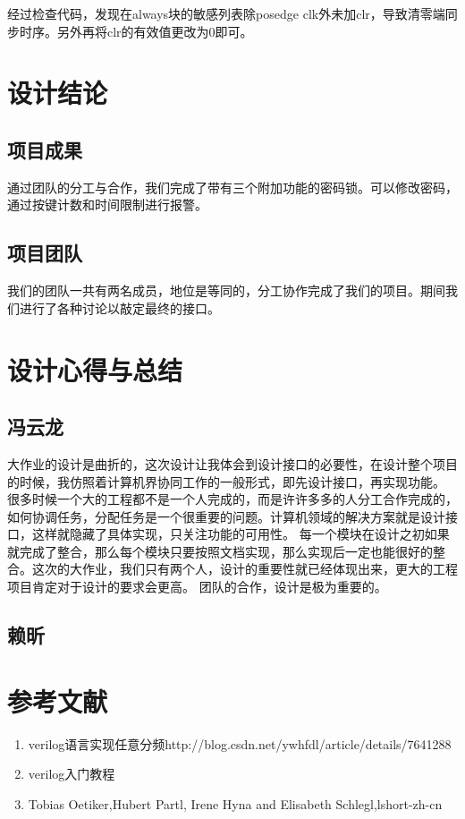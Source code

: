 \documentclass[a4paper,11pt]{ctexart}
\begin{document}
经过检查代码，发现在always块的敏感列表除posedge clk外未加clr，导致清零端同步时序。另外再将clr的有效值更改为0即可。
\section{设计结论}
\subsection{项目成果}
通过团队的分工与合作，我们完成了带有三个附加功能的密码锁。可以修改密码，通过按键计数和时间限制进行报警。
\subsection{项目团队}
我们的团队一共有两名成员，地位是等同的，分工协作完成了我们的项目。期间我们进行了各种讨论以敲定最终的接口。

\section{设计心得与总结}
\subsection{冯云龙}大作业的设计是曲折的，这次设计让我体会到设计接口的必要性，在设计整个项目的时候，我仿照着计算机界协同工作的一般形式，即先设计接口，再实现功能。
很多时候一个大的工程都不是一个人完成的，而是许许多多的人分工合作完成的，如何协调任务，分配任务是一个很重要的问题。计算机领域的解决方案就是设计接口，这样就隐藏了具体实现，只关注功能的可用性。
每一个模块在设计之初如果就完成了整合，那么每个模块只要按照文档实现，那么实现后一定也能很好的整合。这次的大作业，我们只有两个人，设计的重要性就已经体现出来，更大的工程项目肯定对于设计的要求会更高。
团队的合作，设计是极为重要的。
\subsection{赖昕}


\section{参考文献}

\begin{enumerate}
  \item verilog语言实现任意分频http://blog.csdn.net/ywhfdl/article/details/7641288
  \item verilog入门教程
  \item Tobias Oetiker,Hubert Partl, Irene Hyna and Elisabeth Schlegl,lshort-zh-cn
\end{enumerate}
\end{document}
